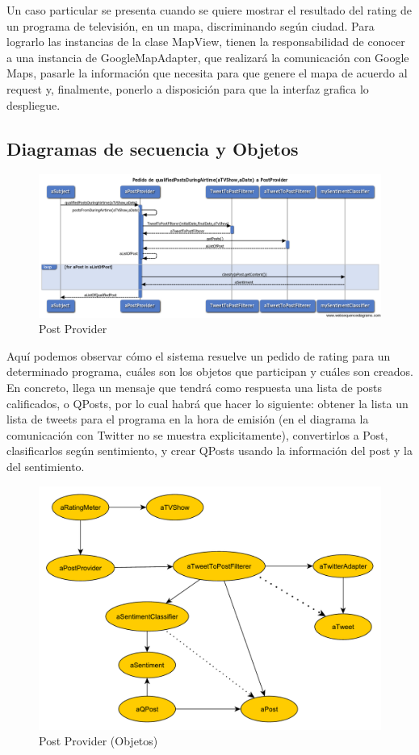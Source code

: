 Un caso particular se presenta cuando se quiere mostrar el resultado del rating de un programa de televisión, en un mapa, discriminando según ciudad. Para lograrlo las instancias de la clase MapView, tienen la responsabilidad de conocer a una instancia de GoogleMapAdapter, que realizará la comunicación con Google Maps, pasarle la información que necesita para que genere el mapa de acuerdo al request y, finalmente, ponerlo a disposición para que la interfaz grafica lo despliegue.  

\subsection{Diagramas de secuencia y Objetos}

\begin{figure}[H]
\centering
\includegraphics[width=\textwidth]{graph/diagramas_secuencia/PostProvider.png}
\caption{Post Provider}
\end{figure}

Aquí podemos observar cómo el sistema resuelve un pedido de rating para un determinado programa, cuáles son los objetos que participan y cuáles son creados. En concreto, llega un mensaje que tendrá como respuesta una lista de posts calificados, o QPosts, por lo cual habrá que hacer lo siguiente: obtener la lista un lista de tweets para el programa en la hora de emisión (en el diagrama la comunicación con Twitter no se muestra explicitamente), convertirlos a Post, clasificarlos según sentimiento, y crear QPosts usando la información del post y la del sentimiento.

\begin{figure}[H]
\centering
\includegraphics[width=\textwidth]{graph/objetos/PostProvider.pdf}
\caption{Post Provider (Objetos)}
\end{figure}




